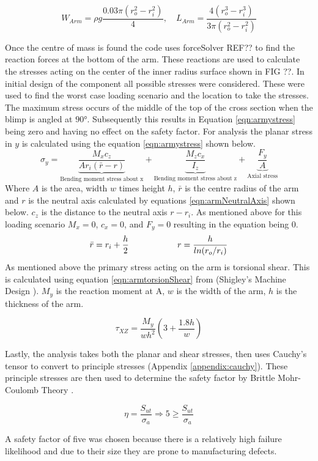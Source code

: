 \documentclass[../main.tex]{subfiles}
\begin{document}
\begin{equation} \label{eqn:armCg}
W_{Arm} = \rho g\frac{0.03\pi(r_o^2 - r_i^2)}{4}, \quad L_{Arm} =\frac{4(r_o^3 - r_i^3)}{3\pi(r_o^2 - r_i^2)}
\end{equation}

Once the centre of mass is found the code uses forceSolver REF?? to find the reaction forces at the bottom of the arm. These reactions are used to calculate the stresses acting on the center of the inner radius surface shown in FIG ??. In initial design of the component all possible stresses were considered. These were used to find the worst case loading scenario and the location to take the stresses. The maximum stress occurs of the middle of the top of the cross section when the blimp is angled at $90°$. Subsequently this results in Equation \ref{eqn:armystress} being zero and having no effect on the safety factor. For analysis the planar stress in $y$ is calculated using the equation \ref{eqn:armystress} shown below. 
\begin{equation}
\label{eqn:armystress}
\sigma_{y}=  \underbrace{\frac{M_{x}c_z}{A r_i (\bar{r} - r)}}_\text{Bending moment stress about x} + \underbrace{\frac{M_{z}c_x}{I_z}}_\text{Bending moment stress about z} + \underbrace{\frac{F_y}{A}}_\text{Axial stress} 
\end{equation}
Where $A$ is the area, width $w$ times height $h$, $\bar{r}$ is the centre radius of the arm and $r$ is the neutral axis calculated by equations \ref{eqn:armNeutralAxis} shown below. $c_z$ is the distance to the neutral axis $r - r_i$. As mentioned above for this loading scenario $M_x = 0$, $c_x = 0$, and $F_y = 0$ resulting in the equation being 0.
\begin{equation} \label{eqn:armNeutralAxis}
\bar{r} = r_i + \frac{h}{2} \hspace{20mm}  r = \frac{h}{ln(r_o/r_i)}
\end{equation}
As mentioned above the primary stress acting on the arm is torsional shear. This is calculated using equation \ref{eqn:armtorsionShear} from {(Shigley's Machine Design \cite[102]{shigley})}. $M_y$ is the reaction moment at A, $w$ is the width of the arm, $h$ is the thickness of the arm.

\begin{equation} \label{eqn:armtorsionShear}
\tau_{XZ} = \dfrac{M_{y}}{wh^2}(3+\frac{1.8h}{w})
\end{equation}

Lastly, the analysis takes both the planar and shear stresses, then uses Cauchy's tensor to convert to principle stresses (Appendix \ref{appendix:cauchy}). These principle stresses are then used to determine the safety factor by Brittle Mohr-Coulomb Theory \cite[227]{shigley}.

\begin{equation}
\eta = \dfrac{S_{ut}}{\sigma _a} \Rightarrow 5 \geq \dfrac{S_{ut}}{\sigma _a}
\end{equation}

A safety factor of five was chosen because there is a relatively high failure likelihood and due to their size they are prone to manufacturing defects.
\end{document}
